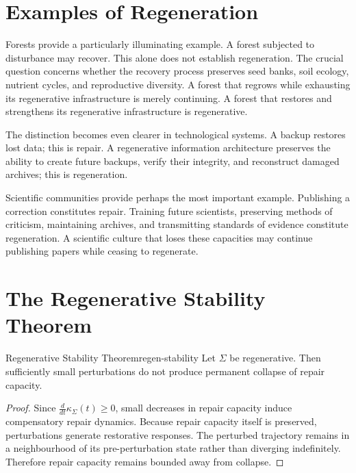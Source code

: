 \documentclass[12pt,twoside,openright]{book}
\begin{document}
\section{Examples of Regeneration}
\label{sec:ch11-examples}

Forests provide a particularly illuminating example. A
forest subjected to disturbance may recover. This alone does
not establish regeneration. The crucial question concerns
whether the recovery process preserves seed banks, soil
ecology, nutrient cycles, and reproductive diversity. A
forest that regrows while exhausting its regenerative
infrastructure is merely continuing. A forest that restores
and strengthens its regenerative infrastructure is
regenerative.

The distinction becomes even clearer in technological
systems. A backup restores lost data; this is repair. A
regenerative information architecture preserves the ability
to create future backups, verify their integrity, and
reconstruct damaged archives; this is regeneration.

Scientific communities provide perhaps the most important
example. Publishing a correction constitutes repair.
Training future scientists, preserving methods of
criticism, maintaining archives, and transmitting standards
of evidence constitute regeneration. A scientific culture
that loses these capacities may continue publishing papers
while ceasing to regenerate.

\section{The Regenerative Stability Theorem}
\label{sec:ch11-stability}

\begin{theorem}{Regenerative Stability Theorem}{regen-stability}
  Let $\Sigma$ be regenerative. Then sufficiently small
  perturbations do not produce permanent collapse of repair
  capacity.
\end{theorem}

\begin{proof}
  Since $\frac{d}{dt}\kappa_\Sigma(t)\ge0$, small decreases
  in repair capacity induce compensatory repair dynamics.
  Because repair capacity itself is preserved, perturbations
  generate restorative responses. The perturbed trajectory
  remains in a neighbourhood of its pre-perturbation state
  rather than diverging indefinitely. Therefore repair
  capacity remains bounded away from collapse.
\end{proof}
\end{document}
